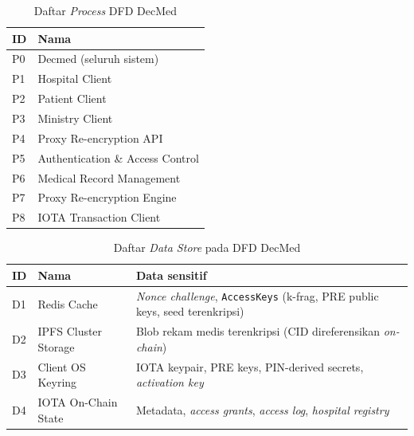\begin{table}[H]
	\centering
	\caption{Daftar \textit{Process} DFD DecMed}
	\label{tab:dfd-process}
	\small
	\begin{tabular}{|p{}|p{}|}
		\hline
		\textbf{ID} & \textbf{Nama}                    \\ \hline
		P0          & Decmed (seluruh sistem)          \\ \hline
		P1          & Hospital Client                  \\ \hline
		P2          & Patient Client                   \\ \hline
		P3          & Ministry Client                  \\ \hline
		P4          & Proxy Re-encryption API          \\ \hline
		P5          & Authentication \& Access Control \\ \hline
		P6          & Medical Record Management        \\ \hline
		P7          & Proxy Re-encryption Engine       \\ \hline
		P8          & IOTA Transaction Client          \\ \hline
	\end{tabular}
\end{table}

\begin{table}[H]
	\centering
	\caption{Daftar \textit{Data Store} pada DFD DecMed}
	\label{tab:dfd-data-store}
	\small
	\begin{tabular}{|p{}|p{}|p{}|}
		\hline
		\textbf{ID} & \textbf{Nama}        & \textbf{Data sensitif}                                                                    \\ \hline
		D1          & Redis Cache          & \textit{Nonce challenge}, \texttt{AccessKeys} (k-frag, PRE public keys, seed terenkripsi) \\ \hline
		D2          & IPFS Cluster Storage & Blob rekam medis terenkripsi (CID direferensikan \textit{on-chain})                       \\ \hline
		D3          & Client OS Keyring    & IOTA keypair, PRE keys, PIN-derived secrets, \textit{activation key}                      \\ \hline
		D4          & IOTA On-Chain State  & Metadata, \textit{access grants}, \textit{access log}, \textit{hospital registry}         \\ \hline
	\end{tabular}
\end{table}

